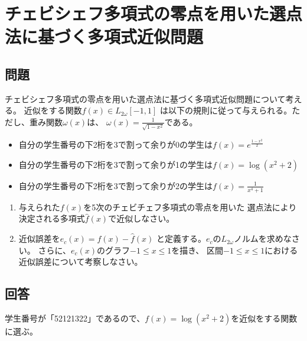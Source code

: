 \newpage

\section{チェビシェフ多項式の零点を用いた選点法に基づく多項式近似問題} \label{section:4}

\subsection{問題}

チェビシェフ多項式の零点を用いた選点法に基づく多項式近似問題について考える。
近似をする関数\(f\left(x\right) \in L_{2\omega} \left[-1,1\right]\)
は以下の規則に従って与えられる。ただし、重み関数\(\omega \left(x\right)\)は、
\(\omega \left(x\right) = \frac{1}{\sqrt{1 - x^2}}\)である。

\begin{itemize}
  \item 自分の学生番号の下2桁を3で割って余りが0の学生は\(f\left(x\right) = e^{\frac{1 - x^2}{2}}\)
  \item 自分の学生番号の下2桁を3で割って余りが1の学生は\(f\left(x\right) = \log \left(x^2 + 2\right)\)
  \item 自分の学生番号の下2桁を3で割って余りが2の学生は\(f\left(x\right) = \frac{1}{x^4 + 1}\)
\end{itemize}

\begin{enumerate}
  \item 与えられた\(f\left(x\right)\)を5次のチェビチェフ多項式の零点を用いた
  選点法により決定される多項式\(\hat{f}\left(x\right)\)で近似しなさい。
  \item 近似誤差を\(e_c \left(x\right) = f\left(x\right) - \hat{f}\left(x\right)\)
  と定義する。\(e_c\)の\(L_{2\omega}\)ノルムを求めなさい。
  さらに、\(e_c\left(x\right)\)のグラフ\(-1 \leq x \leq 1\)を描き、
  区間\(-1 \leq x \leq 1\)における近似誤差について考察しなさい。

\end{enumerate}

\subsection{回答}

学生番号が「52121322」であるので、\(f\left(x\right) = \log \left(x^{2} + 2\right)\)を近似をする関数に選ぶ。


